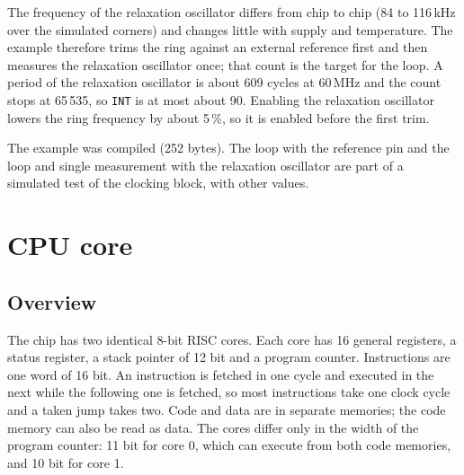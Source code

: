 \documentclass[10pt,a4paper]{article}
\newcommand{\reg}[1]{\texttt{#1}}
\begin{document}


The frequency of the relaxation oscillator differs from chip to chip (84 to 116\,kHz over the simulated
corners) and changes little with supply and temperature. The example therefore trims the ring against an
external reference first and then measures the relaxation oscillator once; that count is the target for the
loop. A period of the relaxation oscillator is about 609 cycles at 60\,MHz and the count stops at 65\,535, so
\reg{INT} is at most about 90. Enabling the relaxation oscillator lowers the ring frequency by about 5\,\%, so
it is enabled before the first trim.

The example was compiled (252 bytes). The loop with the reference pin and the loop and single measurement
with the relaxation oscillator are part of a simulated test of the clocking block, with other values.



\section{CPU core}\label{sec:core}

\subsection{Overview}

The chip has two identical 8-bit RISC cores. Each core has 16 general registers, a status register, a stack
pointer of 12 bit and a program counter. Instructions are one word of 16 bit. An instruction is fetched in one
cycle and executed in the next while the following one is fetched, so most instructions take one clock cycle
and a taken jump takes two. Code and data are in separate memories; the code memory can also be read as data.
The cores differ only in the width of the program counter: 11 bit for core 0, which can execute from both code
memories, and 10 bit for core 1.
\end{document}
